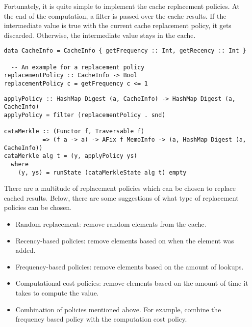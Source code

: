Fortunately, it is quite simple to implement the cache replacement policies. At the end of the  computation, a filter is passed over the cache results. If the intermediate value is true with the current cache replacement policy, it gets discarded. Otherwise, the intermediate value stays in the cache. 

\begin{verbatim}
data CacheInfo = CacheInfo { getFrequency :: Int, getRecency :: Int }
  
  -- An example for a replacement policy
replacementPolicy :: CacheInfo -> Bool
replacementPolicy c = getFrequency c <= 1
\end{verbatim}

\begin{verbatim}
applyPolicy :: HashMap Digest (a, CacheInfo) -> HashMap Digest (a, CacheInfo)
applyPolicy = filter (replacementPolicy . snd)

cataMerkle :: (Functor f, Traversable f) 
           => (f a -> a) -> AFix f MemoInfo -> (a, HashMap Digest (a, CacheInfo))
cataMerkle alg t = (y, applyPolicy ys)
  where
    (y, ys) = runState (cataMerkleState alg t) empty
\end{verbatim}

There are a multitude of replacement policies which can be chosen to replace cached results. Below, there are some suggestions of what type of replacement policies can be chosen.
\begin{itemize}
  \item Random replacement: remove random elements from the cache.
  \item Recency-based policies: remove elements based on when the element was added.
  \item Frequency-based policies: remove elements based on the amount of lookups.
  \item Computational cost policies: remove elements based on the amount of time it takes to compute the value.
  \item Combination of policies mentioned above. For example, combine the frequency based policy with the computation cost policy.
\end{itemize}